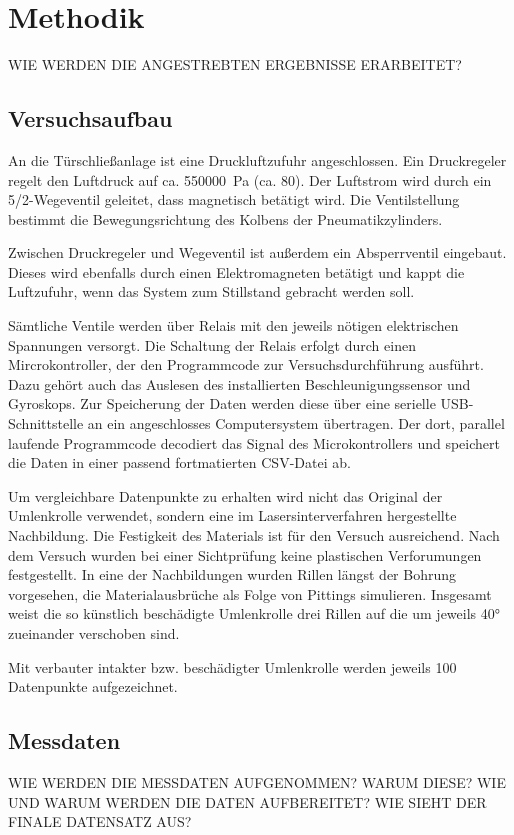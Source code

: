 \chapter{Methodik}
\label{ch:methodik}

WIE WERDEN DIE ANGESTREBTEN ERGEBNISSE ERARBEITET?

\section{Versuchsaufbau}
\label{sec:versuchsaufbau}
An die Türschließanlage ist eine Druckluftzufuhr angeschlossen. Ein Druckregeler regelt den Luftdruck auf ca. \SI{550000}{\pascal} (ca. \SI{80}{\psi}). Der Luftstrom wird durch ein 5/2-Wegeventil geleitet, dass magnetisch betätigt wird. Die Ventilstellung bestimmt die Bewegungsrichtung des Kolbens der Pneumatikzylinders. 

Zwischen Druckregeler und Wegeventil ist außerdem ein Absperrventil eingebaut. Dieses wird ebenfalls durch einen Elektromagneten betätigt und kappt die Luftzufuhr, wenn das System zum Stillstand gebracht werden soll.

Sämtliche Ventile werden über Relais mit den jeweils nötigen elektrischen Spannungen versorgt. Die Schaltung der Relais erfolgt durch einen Mircrokontroller, der den Programmcode zur Versuchsdurchführung ausführt. Dazu gehört auch das Auslesen des installierten Beschleunigungssensor und Gyroskops. Zur Speicherung der Daten werden diese über eine serielle USB-Schnittstelle an ein angeschlosses Computersystem übertragen. Der dort, parallel laufende Programmcode decodiert das Signal des Microkontrollers und speichert die Daten in einer passend fortmatierten CSV-Datei ab.

Um vergleichbare Datenpunkte zu erhalten wird nicht das Original der Umlenkrolle verwendet, sondern eine im Lasersinterverfahren hergestellte Nachbildung. Die Festigkeit des Materials ist für den Versuch ausreichend. Nach dem Versuch wurden bei einer Sichtprüfung keine plastischen Verforumungen festgestellt. In eine der Nachbildungen wurden Rillen längst der Bohrung vorgesehen, die Materialausbrüche als Folge von Pittings simulieren. Insgesamt weist die so künstlich beschädigte Umlenkrolle drei Rillen auf die um jeweils 40°  zueinander verschoben sind.

Mit verbauter intakter bzw. beschädigter Umlenkrolle werden jeweils 100 Datenpunkte aufgezeichnet.

\section{Messdaten}
\label{sec:messdaten}
WIE WERDEN DIE MESSDATEN AUFGENOMMEN? WARUM DIESE? WIE UND WARUM WERDEN DIE DATEN AUFBEREITET? WIE SIEHT DER FINALE DATENSATZ AUS?

